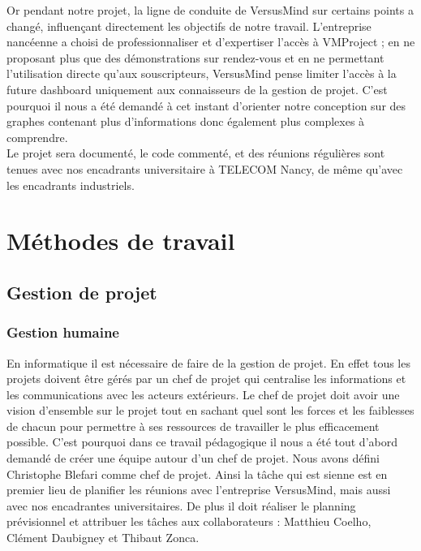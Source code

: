 \documentclass[12pt]{report}
\begin{document}
Or pendant notre projet, la ligne de conduite de VersusMind sur certains points a changé, influençant directement les objectifs de notre travail. L’entreprise nancéenne  a choisi de professionnaliser et d’expertiser l’accès à VMProject ; en ne proposant plus que des démonstrations sur rendez-vous et en ne permettant l’utilisation directe qu’aux souscripteurs, VersusMind pense limiter l’accès à la future dashboard uniquement aux connaisseurs de la gestion de projet. C’est pourquoi il nous a été demandé à cet instant d’orienter notre conception sur des graphes contenant plus d’informations donc également plus complexes à comprendre. \\
Le projet sera documenté, le code commenté, et des réunions régulières sont tenues avec nos encadrants universitaire à TELECOM Nancy, de même qu’avec les encadrants industriels.\\

\chapter{Méthodes de travail}

	\section{Gestion de projet}
		\subsection{Gestion humaine}
		
En informatique il est nécessaire de faire de la gestion de projet. En effet tous les projets doivent être gérés par un chef de projet qui centralise les informations et les communications avec les acteurs extérieurs. Le chef de projet doit avoir une vision d’ensemble sur le projet tout en sachant quel sont les forces et les faiblesses de chacun pour permettre à ses ressources de travailler le plus efficacement possible. C’est pourquoi dans ce travail pédagogique il nous a été tout d’abord demandé de créer une équipe autour d’un chef de projet. Nous avons défini Christophe Blefari comme chef de projet. Ainsi la tâche qui est sienne est en premier lieu de planifier les réunions avec l’entreprise VersusMind, mais aussi avec nos encadrantes universitaires. De plus il doit réaliser le planning prévisionnel et attribuer les tâches aux collaborateurs : Matthieu Coelho, Clément Daubigney et Thibaut Zonca.\\

\end{document}
